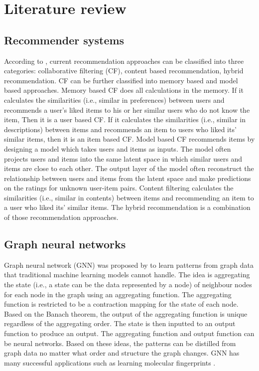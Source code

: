 \documentclass[11pt,twoside]{report}
\begin{document}
\chapter{Literature review}
\section{Recommender systems}
According to \cite{mansur_review_nodate, park_literature_2012}, current recommendation approaches can be classified into three categories: collaborative filtering (CF), content based recommendation, hybrid recommendation. CF can be further classified into memory based and model based approaches. Memory based CF does all calculations in the memory. If it calculates the similarities (i.e., similar in preferences) between users and recommends a user's liked items to his or her similar users who do not know the item, Then it is a user based CF. If it calculates the similarities (i.e., similar in descriptions) between items and recommends an item to users who liked its' similar items, then it is an item based CF. Model based CF recommends items by designing a model which takes users and items as inputs. The model often projects users and items into the same latent space in which similar users and items are close to each other. The output layer of the model often reconstruct the relationship between users and items from the latent space and make predictions on the ratings for unknown user-item pairs. Content filtering calculates the similarities (i.e., similar in contents) between items and recommending an item to a user who liked its' similar items. The hybrid recommendation is a combination of those recommendation approaches.

\section{Graph neural networks}
Graph neural network (GNN) was proposed by \cite{gori_new_2005, scarselli_graph_2009} to learn patterns from graph data that traditional machine learning models cannot handle. The idea is aggregating the state (i.e., a state can be the data represented by a node) of neighbour nodes for each node in the graph using an aggregating function. The aggregating function is restricted to be a contraction mapping for the state of each node. Based on the Banach theorem, the output of the aggregating function is unique regardless of the aggregating order. The state is then inputted to an output function to produce an output. The aggregating function and output function can be neural networks. Based on these ideas, the patterns can be distilled from graph data no matter what order and structure the graph changes. GNN has many successful applications such as learning molecular fingerprints \cite{duvenaud_convolutional_2015}.
\end{document}
